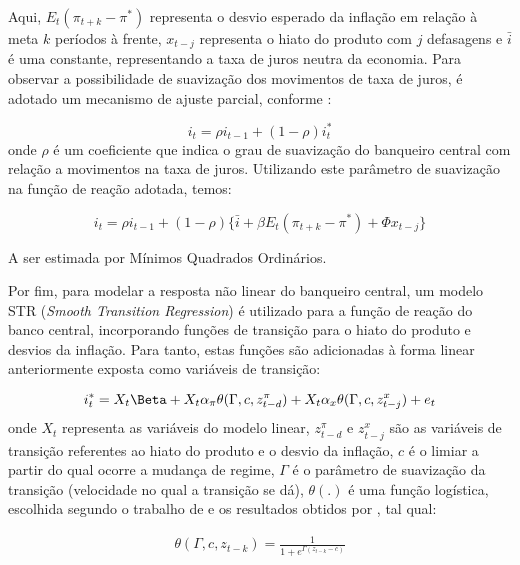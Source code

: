 \documentclass[
	article,			%
	11pt,				%
	oneside,			%
	a4paper,			%
	english,			%
	brazil,				%
	]{abntex2}
\begin{document}
	Aqui, $E_t(\pi_{t+k} - \pi^*)$ representa o desvio esperado da inflação em relação à meta $k$ períodos à frente, $x_{t-j}$ representa o hiato do produto com $j$ defasagens e $\bar{i}$ é uma constante, representando a taxa de juros neutra da economia. Para observar a possibilidade de suavização dos movimentos de taxa de juros, é adotado um mecanismo de ajuste parcial, conforme :
		
	\begin{equation}
		i_t = \rho i_{t-1} + (1-\rho) i_t^*
	\end{equation}
	onde $\rho$ é um coeficiente que indica o grau de suavização do banqueiro central com relação a movimentos na taxa de juros. Utilizando este parâmetro de suavização na função de reação adotada, temos:
	
	\begin{equation} \label{linear}
		i_t = \rho i_{t-1} + (1-\rho) \{ \bar{i} + \beta E_t(\pi_{t+k} - \pi^*) + \Phi x_{t-j} \}
	\end{equation}
	
	A ser estimada por Mínimos Quadrados Ordinários.
	
	Por fim, para modelar a resposta não linear do banqueiro central, um modelo STR (\textit{Smooth Transition Regression}) é utilizado para a função de reação do banco central, incorporando funções de transição para o hiato do produto e desvios da inflação. Para tanto, estas funções são adicionadas à forma linear anteriormente exposta como variáveis de transição:
	
	\begin{equation}
		i_t^* = X_t \Beta + X_t \alpha_\pi \theta(\Gamma,c,z_{t-d}^\pi) + X_t \alpha_x \theta (\Gamma,c,z_{t-j}^x) + e_t
	\end{equation}
	onde $X_t$ representa as variáveis do modelo linear, $z_{t-d}^\pi$ e $z_{t-j}^x$ são as variáveis de transição referentes ao hiato do produto e o desvio da inflação, $c$ é o limiar a partir do qual ocorre a mudança de regime, $\Gamma$ é o parâmetro de suavização da transição (velocidade no qual a transição se dá), $\theta(.)$ é uma função logística, escolhida segundo o trabalho de  e os resultados obtidos por , tal qual:
	
	\begin{eqnarray}  \label{func_log}
		\theta (\Gamma,c,z_{t-k}) = \frac{1}{1+e^{\Gamma (z_{t-k} - c)}} 
	\end{eqnarray}
	
\end{document}
